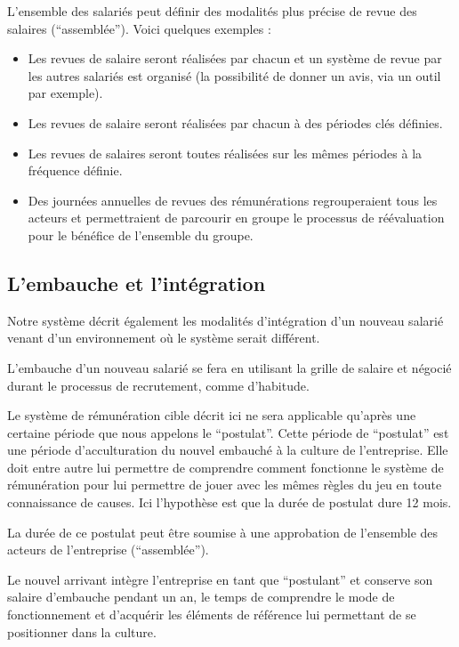 \documentclass[12pt]{article}
\begin{document}
 L’ensemble des salariés peut définir des modalités plus précise de revue des salaires (“assemblée”). Voici quelques exemples :
 \begin{itemize}
   \item Les revues de salaire seront réalisées par chacun et un système de revue par les autres salariés est organisé (la possibilité de donner un avis, via un outil par exemple).
   \item Les revues de salaire seront réalisées par chacun à des périodes clés définies. 
   \item Les revues de salaires seront toutes réalisées sur les mêmes périodes à la fréquence définie.
   \item Des journées annuelles de revues des rémunérations regrouperaient tous les acteurs et permettraient de parcourir en groupe le processus de réévaluation pour le bénéfice de l'ensemble du groupe.
 \end{itemize}

\subsection{L’embauche et l’intégration}

 Notre système décrit également les modalités d’intégration d’un nouveau salarié venant d’un environnement où le système serait différent.

 L’embauche d’un nouveau salarié se fera en utilisant la grille de salaire et négocié durant le processus de recrutement, comme d’habitude. 

 Le système de rémunération cible décrit ici ne sera applicable qu’après une certaine période que nous appelons le “postulat”. Cette période de “postulat” est une période d’acculturation du nouvel embauché à la culture de l’entreprise. Elle doit entre autre lui permettre de comprendre comment fonctionne le système de rémunération pour lui permettre de jouer avec les mêmes règles du jeu en toute connaissance de causes. Ici l’hypothèse est que la durée de postulat dure 12 mois. 

 La durée de ce postulat peut être soumise à une approbation de l’ensemble des acteurs de l’entreprise (“assemblée”).

 Le nouvel arrivant intègre l’entreprise en tant que “postulant” et conserve son salaire d’embauche pendant un an, le temps de comprendre le mode de fonctionnement et d’acquérir les éléments de référence lui permettant de se positionner dans la culture.  
\end{document}
